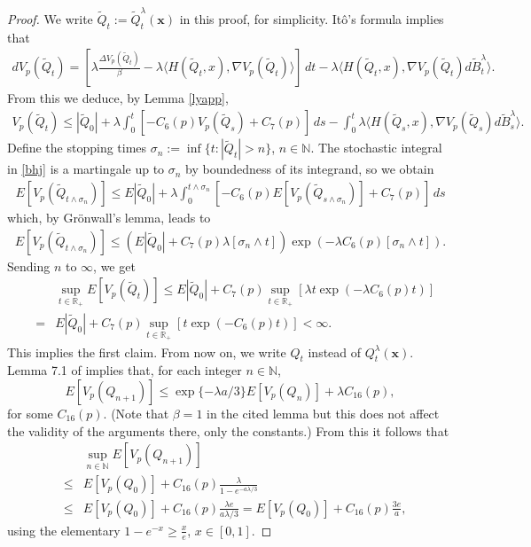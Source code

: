 \documentclass[a4paper,draft]{article}
\begin{document}
\begin{proof} We write
$\tilde{Q}_t:=\tilde{Q}^{\lambda}_t(\mathbf{x})$ in this proof, for simplicity.
It\^o's formula implies that
\begin{eqnarray*}
dV_p(\tilde{Q}_t)=\left[\lambda\frac{\Delta V_p(\tilde{Q}_t)}{\beta}-\lambda \langle H(\tilde{Q}_t,x),\nabla V_p(\tilde{Q}_t)\rangle\right]\, dt-\lambda \langle H(\tilde{Q}_t,x),\nabla V_p(\tilde{Q}_t)d\tilde{B}^{\lambda}_t\rangle.
\end{eqnarray*}
From this we deduce, by Lemma \ref{lyapp},
\begin{eqnarray}\label{bhj}
V_p(\tilde{Q}_t)\leq |\tilde{Q}_0|+\lambda \int_0^t [-C_6(p)V_p(\tilde{Q}_s)+C_7(p)]\, ds -\int_0^t \lambda \langle H(\tilde{Q}_s,x),\nabla V_p(\tilde{Q}_s)d\tilde{B}^{\lambda}_s\rangle.
\end{eqnarray}
Define the stopping times $\sigma_n:=\inf\{t:|\tilde{Q}_t|>n\}$, $n\in\mathbb{N}$. The stochastic integral
in \eqref{bhj} is a martingale up to $\sigma_n$ by boundedness of its integrand, so we obtain
\begin{eqnarray*}
E[V_p(\tilde{Q}_{t\wedge\sigma_n})]\leq E|\tilde{Q}_0|+\lambda\int_0^{t\wedge \sigma_n} [-C_6(p)
E[V_p(\tilde{Q}_{s\wedge\sigma_n})]+C_7(p)]\, ds
\end{eqnarray*}
which, by Gr\"onwall's lemma, leads to
\begin{eqnarray*}
E[V_p(\tilde{Q}_{t\wedge \sigma_n})]\leq \left(E|\tilde{Q}_0|+C_7(p)\lambda[\sigma_n\wedge t]
\right)\exp\left(-\lambda C_6(p) [\sigma_n\wedge t]\right).
\end{eqnarray*}
Sending $n$ to $\infty$, we get
\begin{eqnarray*}
& & \sup_{t\in\mathbb{R}_+}E[V_p(\tilde{Q}_{t})]\leq E|\tilde{Q}_0|+C_7(p)\sup_{t\in\mathbb{R}_+}\left[\lambda t\exp(-\lambda C_6(p)t)\right]\\ &=&
E|\tilde{Q}_0|+C_7(p)\sup_{t\in\mathbb{R}_+}\left[t\exp(-C_6(p)t)\right]<\infty.
\end{eqnarray*}
This implies the first claim.
From now on, we write $Q_t$ instead of $Q_t^{\lambda}(\mathbf{x})$.
Lemma 7.1 of \cite{convex} implies that, for each integer $n\in\mathbb{N}$,
$$
E[V_p(Q_{n+1})]\leq \exp\{-\lambda a/3\}E[V_p(Q_n)]+\lambda C_{16}(p),
$$ for some $C_{16}(p)$. (Note that $\beta=1$ in the cited lemma but
this does not affect the validity of the arguments there, only the constants.)
From this it follows that
\begin{eqnarray*}
& &
\sup_{n\in\mathbb{N}}E[V_p(Q_{n+1})]\\
&\leq& E[V_p(Q_0)]+ C_{16}(p)\frac{\lambda}{1-e^{-a\lambda/3}}\\
&\leq& E[V_p(Q_0)]+ C_{16}(p)\frac{\lambda e}{a\lambda/3} =E[V_p(Q_0)]+ C_{16}(p)\frac{3e}{a},
\end{eqnarray*}
using the elementary $1-e^{-x}\geq\frac{x}{e}$, $x\in [0,1]$.


\end{proof}
\end{document}
